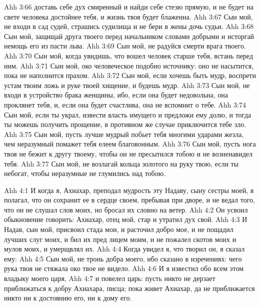 \vs Ahh 3:66
доставь себе дух смиренный и найди себе стезю прямую, и не будет на свете человека достойнее тебя, и жизнь твоя будет блаженна.
\vs Ahh 3:67
Сын мой, не входи в сад судей, страшись судилища и не бери в жены дочь судьи.
\vs Ahh 3:68
Сын мой, защищай друга твоего перед начальником словами добрыми и исторгай немощь его из пасти льва.
\vs Ahh 3:69
Сын мой, не радуйся смерти врага твоего.
\vs Ahh 3:70
Сын мой, когда увидишь, что вошел человек старше тебя, встань перед ним.
\vs Ahh 3:71
Сын мой, око человеческое подобно источнику: оно не насытится, пока не наполнится прахом.
\vs Ahh 3:72
Сын мой, если хочешь быть мудр, воспрети устам твоим ложь и руке твоей хищение, и будешь мудр.
\vs Ahh 3:73
Сын мой, не входи в устройство брака женщины, ибо, если она будет недовольна, она проклянет тебя, и, если она будет счастлива, она не вспомнит о тебе.
\vs Ahh 3:74
Сын мой, если ты украл, извести власть имущего и предложи ему долю, и тогда ты можешь получить прощение, в противном же случае приключится тебе зло.
\vs Ahh 3:75
Сын мой, пусть лучше мудрый побьет тебя многими ударами жезла, чем неразумный помажет тебя елеем благовонным.
\vs Ahh 3:76
Сын мой, пусть нога твоя не бежит к другу твоему, чтобы он не пресытился тобою и не возненавидел тебя.
\vs Ahh 3:77
Сын мой, не возлагай кольца золотого на руку твою, если ты небогат, чтобы неразумные не глумились над тобою.

\vs Ahh 4:1
И когда я, Ахиахар, преподал мудрость эту Надаву, сыну сестры моей, я полагал, что он сохранит ее в сердце своем, пребывая при дворе, и не ведал того, что он не слушал слов моих, но бросал их словно на ветер.
\vs Ahh 4:2
Он усвоил обыкновение говорить: Ахиахар, отец мой, стар и утратил дух свой.
\vs Ahh 4:3
И Надав, сын мой, присвоил стада мои, и расточил добро мое, и не пощадил лучших слуг моих, и бил их пред лицем моим, и не пожалел скотов моих и мулов моих, и умерщвлял их.
\vs Ahh 4:4
Когда увидел я, что творил он, я сказал ему:
\vs Ahh 4:5
Сын мой, не тронь добра моего, ибо сказано в изречениях: чего рука твоя не стяжала око твое не видело.
\vs Ahh 4:6
И я известил обо всем этом владыку моего царя,
\vs Ahh 4:7
и повелел царь: пусть никто не дерзает приближаться к добру Ахиахара, писца; пока живет Ахиахар, да не приближается никто ни к достоянию его, ни к дому его.


